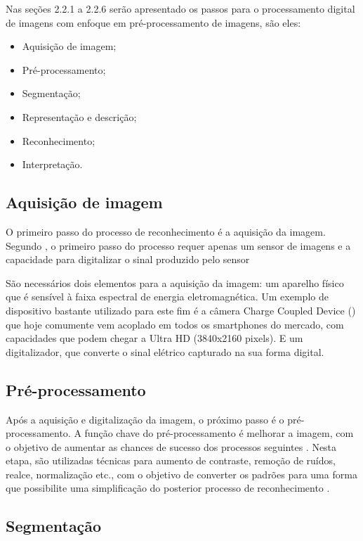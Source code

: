 Nas seções 2.2.1 a 2.2.6 serão apresentado os passos para o processamento digital de imagens com enfoque em pré-processamento de imagens, são eles:
\begin{itemize}
\item Aquisição de imagem;
\item Pré-processamento;
\item Segmentação;
\item Representação e descrição;
\item Reconhecimento;
\item Interpretação.
\end{itemize}

\subsection{Aquisição de imagem}
O primeiro passo do processo de reconhecimento é a aquisição da imagem. Segundo , o primeiro passo do processo requer apenas um sensor de imagens e a capacidade para digitalizar o sinal produzido pelo
sensor

São necessários dois elementos para a aquisição da imagem: um aparelho físico que é sensível à faixa espectral de energia eletromagnética. Um exemplo de dispositivo bastante utilizado para este fim é a câmera Charge Coupled Device () que hoje comumente vem acoplado em todos os smartphones do mercado, com capacidades que podem chegar a Ultra HD (3840x2160 pixels). E um digitalizador, que converte o sinal elétrico capturado na sua forma digital.


\subsection{Pré-processamento}
Após a aquisição e digitalização da imagem, o próximo passo é o pré-processamento. A função chave do pré-processamento é melhorar a imagem, com o objetivo de aumentar as chances de sucesso dos processos seguintes \cite{GONZALEZ1992}. Nesta etapa, são utilizadas técnicas para aumento de contraste, remoção de ruídos, realce, normalização etc., com o objetivo de converter os padrões para uma forma que possibilite uma simplificação do posterior processo de reconhecimento \cite{Rodrigues2002}.

\subsection{Segmentação}


